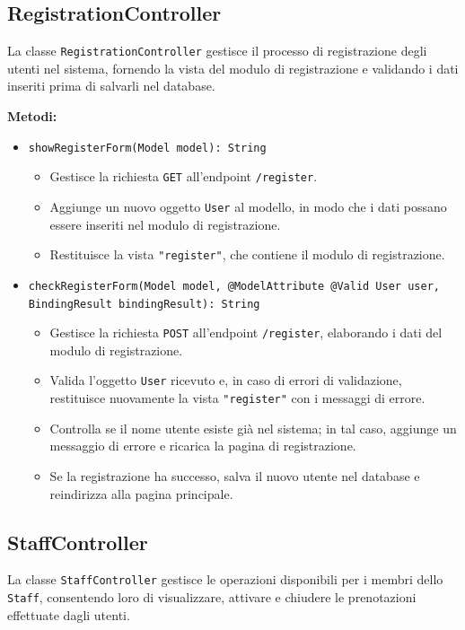 \documentclass[twoside,openright,titlepage,fleqn,headinclude,12pt,a4paper,BCOR=5mm,footinclude]{scrbook}
\begin{document}
\subsection{RegistrationController}
La classe \texttt{RegistrationController} gestisce il processo di registrazione degli utenti nel sistema, fornendo la vista del modulo di registrazione e validando i dati inseriti prima di salvarli nel database.

\textbf{Metodi:}  
\begin{itemize}  
    \item \texttt{showRegisterForm(Model model): String}  
    \begin{itemize}  
        \item Gestisce la richiesta \texttt{GET} all'endpoint \texttt{/register}.  
        \item Aggiunge un nuovo oggetto \texttt{User} al modello, in modo che i dati possano essere inseriti nel modulo di registrazione.  
        \item Restituisce la vista \texttt{"register"}, che contiene il modulo di registrazione.  
    \end{itemize}  

    \item \texttt{checkRegisterForm(Model model, @ModelAttribute @Valid User user, BindingResult bindingResult): String}  
    \begin{itemize}  
        \item Gestisce la richiesta \texttt{POST} all'endpoint \texttt{/register}, elaborando i dati del modulo di registrazione.  
        \item Valida l’oggetto \texttt{User} ricevuto e, in caso di errori di validazione, restituisce nuovamente la vista \texttt{"register"} con i messaggi di errore.  
        \item Controlla se il nome utente esiste già nel sistema; in tal caso, aggiunge un messaggio di errore e ricarica la pagina di registrazione.  
        \item Se la registrazione ha successo, salva il nuovo utente nel database e reindirizza alla pagina principale.  
    \end{itemize}  
\end{itemize}  


\subsection{StaffController}
La classe \texttt{StaffController} gestisce le operazioni disponibili per i membri dello \texttt{Staff}, consentendo loro di visualizzare, attivare e chiudere le prenotazioni effettuate dagli utenti.  
\end{document}
